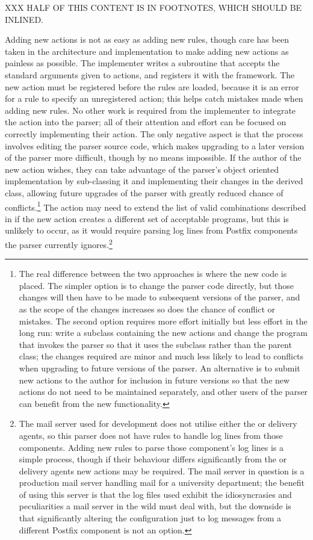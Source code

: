 XXX HALF OF THIS CONTENT IS IN FOOTNOTES, WHICH SHOULD BE INLINED\@.

Adding new actions is not as easy as adding new rules, though care has been
taken in the architecture and implementation to make adding new actions as
painless as possible.  The implementer writes a subroutine that accepts the
standard arguments given to actions, and registers it with the framework.
The new action must be registered before the rules are loaded, because it
is an error for a rule to specify an unregistered action; this helps catch
mistakes made when adding new rules.  No other work is required from the
implementer to integrate the action into the parser; all of their attention
and effort can be focused on correctly implementing their action.  The only
negative aspect is that the process involves editing the parser source
code, which makes upgrading to a later version of the parser more
difficult, though by no means impossible.  If the author of the new action
wishes, they can take advantage of the parser's object oriented
implementation by sub-classing it and implementing their changes in the
derived class, allowing future upgrades of the parser with greatly reduced
chance of conflicts.\footnote{The real difference between the two
approaches is where the new code is placed.  The simpler option is to
change the parser code directly, but those changes will then have to be
made to subsequent versions of the parser, and as the scope of the changes
increases so does the chance of conflict or mistakes.  The second option
requires more effort initially but less effort in the long run: write a
subclass containing the new actions and change the program that invokes the
parser so that it uses the subclass rather than the parent class; the
changes required are minor and much less likely to lead to conflicts when
upgrading to future versions of the parser.  An alternative is to submit
new actions to the author \parsername{} for inclusion in future versions so
that the new actions do not need to be maintained separately, and other
users of the parser can benefit from the new functionality.} The action may
need to extend the list of valid combinations described in  if the new action creates a different set of acceptable
programs, but this is unlikely to occur, as it would require parsing log
lines from Postfix components the parser currently ignores.\footnote{The
mail server used for development does not utilise either the 
or  delivery agents, so this parser does not have rules to
handle log lines from those components.  Adding new rules to parse those
component's log lines is a simple process, though if their behaviour
differs significantly from the  or  delivery
agents new actions may be required.  The mail server in question is a
production mail server handling mail for a university department; the
benefit of using this server is that the log files used exhibit the
idiosyncrasies and peculiarities a mail server in the wild must deal with,
but the downside is that significantly altering the configuration just to
log messages from a different Postfix component is not an option.}


